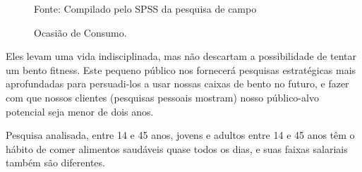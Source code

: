 \vspace*{0.2cm}
\begin{figure}[!htbp]
\begin{footnotesize}
\captionsetup{textfont=bf, labelfont=bf, font=footnotesize, justification=centering}
	\caption {Ocasião de Consumo.} \label{tab:Ocasião de consumo} 
	\vspace*{-0.3cm}
	\data

\vspace*{-0.3cm}
\par
Fonte: Compilado pelo SPSS da pesquisa de campo
\end{footnotesize}
\end{figure}
\par

Eles levam uma vida indisciplinada, mas não descartam a possibilidade de tentar um bento fitness. Este pequeno público nos fornecerá pesquisas estratégicas mais aprofundadas para persuadi-los a usar nossas caixas de bento no futuro, e fazer com que nossos clientes (pesquisas pessoais mostram) nosso público-alvo potencial seja menor de dois anos.\par
 
Pesquisa analisada, entre 14 e 45 anos, jovens e adultos entre 14 e 45 anos têm o hábito de comer alimentos saudáveis quase todos os dias, e suas faixas salariais também são diferentes.

\begin{commentA} \vspace{0.3cm} \noindent * \par \vspace{0.1cm} \end{commentA}

